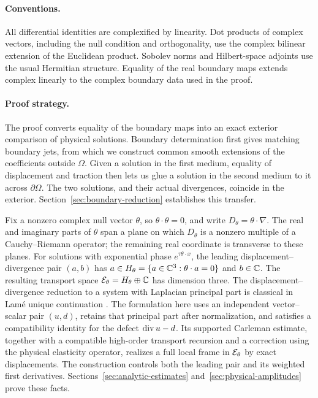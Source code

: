 \paragraph{Conventions.}
All differential identities are complexified by linearity. Dot products
of complex vectors, including the null condition and orthogonality, use
the complex bilinear extension of the Euclidean product. Sobolev norms
and Hilbert-space adjoints use the usual Hermitian structure.
Equality of the real boundary maps extends complex linearly to the
complex boundary data used in the proof.

\paragraph{Proof strategy.}
The proof converts equality of the boundary maps into an exact exterior
comparison of physical solutions. Boundary determination first gives
matching boundary jets, from which we construct common smooth extensions
of the coefficients outside $\Omega$.
Given a solution in the first medium, equality of displacement and
traction then lets us glue a solution in the second medium to it across
$\partial\Omega$. The two solutions, and their actual divergences,
coincide in the exterior. Section~\ref{sec:boundary-reduction} establishes
this transfer.

Fix a nonzero complex null vector $\theta$, so
$\theta\cdot\theta=0$, and write $D_\theta=\theta\cdot\nabla$.
The real and imaginary parts of $\theta$ span a plane on which
$D_\theta$ is a nonzero multiple of a Cauchy--Riemann operator; the
remaining real coordinate is transverse to these planes.
For solutions with exponential phase $e^{\tau\theta\cdot x}$,
the leading displacement--divergence pair $(a,b)$ has
$a\in H_\theta=\{a\in\mathbb C^3:\theta\cdot a=0\}$ and $b\in\mathbb C$.
The resulting transport space
$\mathcal E_\theta=H_\theta\oplus\mathbb C$ has dimension three.
The displacement--divergence reduction to a system with Laplacian
principal part is classical in Lam\'e unique continuation
\cite{Weck1969,ImanuvilovYamamoto2004Carleman}. The formulation here uses
an independent vector--scalar pair $(u,d)$, retains that principal part
after normalization, and satisfies a compatibility identity for the
defect $\operatorname{div} u-d$.
Its supported Carleman estimate, together with a compatible high-order
transport recursion and a correction using the physical elasticity
operator, realizes a full local frame in $\mathcal E_\theta$ by exact
displacements. The construction controls both the leading pair and its
weighted first derivatives. Sections~\ref{sec:analytic-estimates}
and~\ref{sec:physical-amplitudes} prove these facts.

